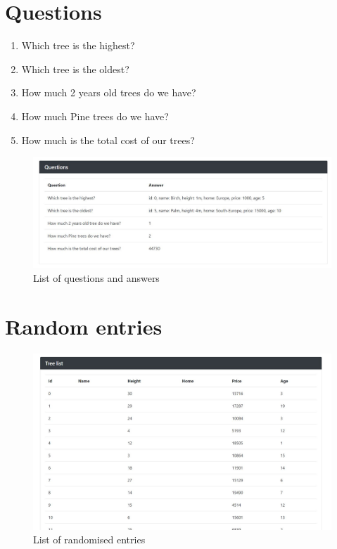 \documentclass[]{article}
\begin{document}
\section{Questions}
\begin{enumerate}
    \item Which tree is the highest?
    \item Which tree is the oldest?
    \item How much 2 years old trees do we have?
    \item How much Pine trees do we have?
    \item How much is the total cost of our trees?
\end{enumerate}
\begin{figure}[h]
    \centering
    \includegraphics[width=\textwidth]{qalist.jpg}
    \caption{List of questions and answers}
\end{figure}

\section{Random entries}
\begin{figure}[h]
    \centering
    \includegraphics[width=\textwidth]{randomtrees.JPG}
    \caption{List of randomised entries}
\end{figure}
\end{document}
